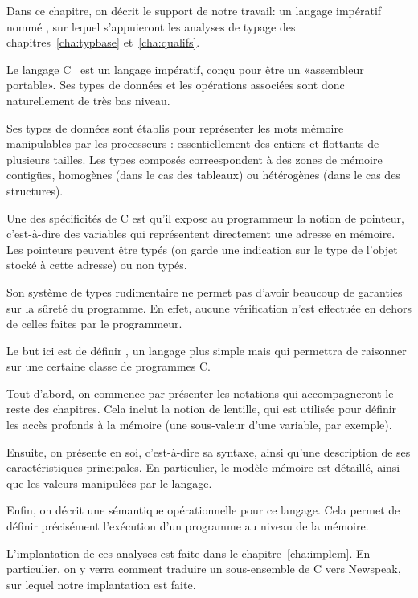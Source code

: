 
Dans ce chapitre, on décrit le support de notre travail: un langage impératif
nommé \langname, sur lequel s'appuieront les analyses de typage des
chapitres~\ref{cha:typbase} et~\ref{cha:qualifs}.

Le langage C~\cite{KandR} est un langage impératif, conçu pour être un
«assembleur portable». Ses types de données et les opérations associées sont
donc naturellement de très bas niveau.

Ses types de données sont établis pour représenter les mots mémoire manipulables
par les processeurs : essentiellement des entiers et flottants de plusieurs
tailles. Les types composés correespondent à des zones de mémoire contigües,
homogènes (dans le cas des tableaux) ou hétérogènes (dans le cas des
structures).


Une des spécificités de C est qu'il expose au programmeur la notion de pointeur,
c'est-à-dire des variables qui représentent directement une adresse en mémoire.
Les pointeurs peuvent être typés (on garde une indication sur le type de l'objet
stocké à cette adresse) ou non typés.

Son système de types rudimentaire ne permet pas d'avoir beaucoup de garanties
sur la sûreté du programme. En effet, aucune vérification n'est effectuée en
dehors de celles faites par le programmeur.

Le but ici est de définir \langname, un langage plus simple mais qui permettra
de raisonner sur une certaine classe de programmes C.

Tout d'abord, on commence par présenter les notations qui accompagneront le
reste des chapitres. Cela inclut la notion de lentille, qui est
utilisée pour définir les accès profonds à la mémoire (une sous-valeur d'une
variable, par exemple).

Ensuite, on présente \langname en soi, c'est-à-dire sa syntaxe, ainsi qu'une
description de ses caractéristiques principales. En particulier, le modèle
mémoire est détaillé, ainsi que les valeurs manipulées par le langage.

Enfin, on décrit une sémantique opérationnelle pour ce langage. Cela permet de
définir précisément l'exécution d'un programme \langname au niveau de la
mémoire.

L'implantation de ces analyses est faite dans le chapitre~\ref{cha:implem}. En
particulier, on y verra comment traduire un sous-ensemble de C vers Newspeak,
sur lequel notre implantation est faite.

